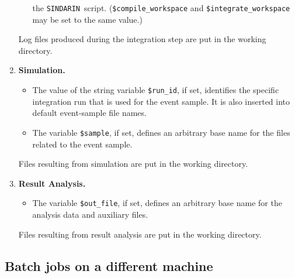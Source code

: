 \documentclass[12pt]{book}
\newcommand{\ttt}[1]{\texttt{#1}}
\newcommand{\sindarin}{\ttt{SINDARIN}}
\begin{document}
\begin{enumerate}
\begin{itemize}
    the \sindarin\ script.  (\ttt{\$compile\_workspace} and
    \ttt{\$integrate\_workspace} may be set to the same value.)
  \end{itemize}
  Log files produced during the integration step are put in the working
  directory.
\item
  \textbf{Simulation.}
  \begin{itemize}
  \item
    The value of the string variable \ttt{\$run\_id}, if set, identifies
    the specific integration run that is used for the event sample.  It is
    also inserted into default event-sample file names.
  \item
    The variable \ttt{\$sample}, if set, defines an arbitrary base name for the
    files related to the event sample.
  \end{itemize}
  Files resulting from simulation are put in the working directory.
\item
  \textbf{Result Analysis.}
  \begin{itemize}
  \item
    The variable \ttt{\$out\_file}, if set,
    defines an arbitrary base name for the analysis data and
    auxiliary files.
  \end{itemize}
  Files resulting from result analysis are put in the working directory.
\end{enumerate}


\subsection{Batch jobs on a different machine}
\end{document}
